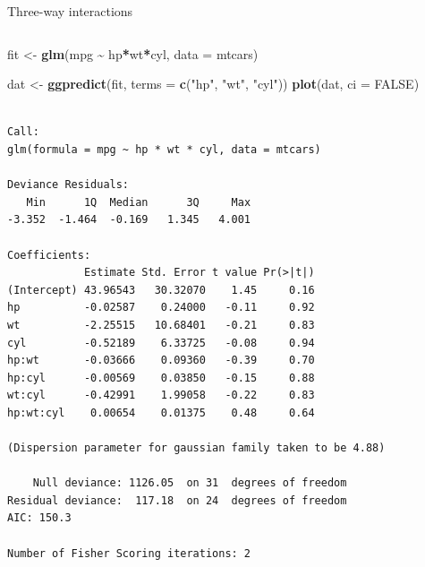 \documentclass[australian,ignorenonframetext,aspectratio=169]{beamer}
\newenvironment{Shaded}{\begin{snugshade}}{\end{snugshade}}
\newcommand{\DataTypeTok}[1]{\textcolor[rgb]{0.13,0.29,0.53}{#1}}
\newcommand{\KeywordTok}[1]{\textcolor[rgb]{0.13,0.29,0.53}{\textbf{#1}}}
\newcommand{\NormalTok}[1]{#1}
\newcommand{\OperatorTok}[1]{\textcolor[rgb]{0.81,0.36,0.00}{\textbf{#1}}}
\newcommand{\OtherTok}[1]{\textcolor[rgb]{0.56,0.35,0.01}{#1}}
\newcommand{\StringTok}[1]{\textcolor[rgb]{0.31,0.60,0.02}{#1}}
\begin{document}
\begin{frame}[fragile]{Three-way interactions}
\protect\hypertarget{three-way-interactions}{}

\begin{columns}[T]
\begin{column}{0.5\textwidth}
\tiny

\begin{Shaded}
\begin{Highlighting}[]
\NormalTok{fit \textless{}{-}}\StringTok{ }\KeywordTok{glm}\NormalTok{(mpg }\OperatorTok{\textasciitilde{}}\StringTok{ }\NormalTok{hp}\OperatorTok{*}\NormalTok{wt}\OperatorTok{*}\NormalTok{cyl, }\DataTypeTok{data =}\NormalTok{ mtcars)}
\end{Highlighting}
\end{Shaded}

\begin{Shaded}
\begin{Highlighting}[]
\NormalTok{dat \textless{}{-}}\StringTok{ }\KeywordTok{ggpredict}\NormalTok{(fit, }\DataTypeTok{terms =} \KeywordTok{c}\NormalTok{(}\StringTok{"hp"}\NormalTok{, }\StringTok{"wt"}\NormalTok{, }\StringTok{"cyl"}\NormalTok{))}
\KeywordTok{plot}\NormalTok{(dat, }\DataTypeTok{ci =} \OtherTok{FALSE}\NormalTok{)}
\end{Highlighting}
\end{Shaded}

\tiny

\begin{verbatim}

Call:
glm(formula = mpg ~ hp * wt * cyl, data = mtcars)

Deviance Residuals: 
   Min      1Q  Median      3Q     Max  
-3.352  -1.464  -0.169   1.345   4.001  

Coefficients:
            Estimate Std. Error t value Pr(>|t|)
(Intercept) 43.96543   30.32070    1.45     0.16
hp          -0.02587    0.24000   -0.11     0.92
wt          -2.25515   10.68401   -0.21     0.83
cyl         -0.52189    6.33725   -0.08     0.94
hp:wt       -0.03666    0.09360   -0.39     0.70
hp:cyl      -0.00569    0.03850   -0.15     0.88
wt:cyl      -0.42991    1.99058   -0.22     0.83
hp:wt:cyl    0.00654    0.01375    0.48     0.64

(Dispersion parameter for gaussian family taken to be 4.88)

    Null deviance: 1126.05  on 31  degrees of freedom
Residual deviance:  117.18  on 24  degrees of freedom
AIC: 150.3

Number of Fisher Scoring iterations: 2
\end{verbatim}
\end{column}


\end{columns}
\end{frame}
\end{document}
